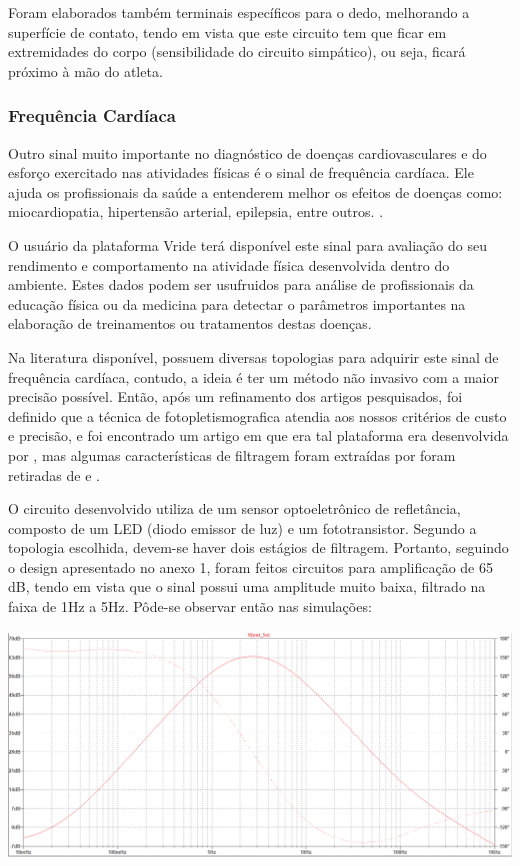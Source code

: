     Foram elaborados também terminais específicos para o dedo, melhorando a superfície de contato, tendo em vista que este circuito tem que ficar em extremidades do corpo (sensibilidade do circuito simpático), ou seja, ficará próximo à mão do atleta.
    

\subsubsection{Frequência Cardíaca}

Outro sinal muito importante no diagnóstico de doenças cardiovasculares e do esforço exercitado nas atividades físicas é o sinal de frequência cardíaca. Ele ajuda os profissionais da saúde a entenderem melhor os efeitos de doenças como: miocardiopatia, hipertensão arterial, epilepsia, entre outros. \cite{VANDERLEI2009} . 
	
O usuário da plataforma Vride terá disponível este sinal para avaliação do seu rendimento e comportamento na atividade física desenvolvida dentro do ambiente. Estes dados podem ser usufruidos para análise de profissionais da educação física ou da medicina para detectar o parâmetros importantes na elaboração de treinamentos ou tratamentos destas doenças. 
	
Na literatura disponível, possuem diversas topologias para adquirir este sinal de frequência cardíaca, contudo, a ideia é ter um método não invasivo com a maior precisão possível. Então, após um refinamento dos artigos pesquisados, foi definido que a técnica de fotopletismografica atendia aos nossos critérios de custo e precisão, e foi encontrado um artigo em que era tal plataforma era desenvolvida por \cite{langereis2010photoplethysmography}, 
mas algumas características de filtragem foram extraídas por foram retiradas de \cite{abhishek2015} e \cite{rheesokwoo2000} . 
	
O circuito desenvolvido utiliza de um sensor optoeletrônico de refletância, composto de um LED (diodo emissor de luz) e um fototransistor. Segundo a topologia escolhida, devem-se haver dois estágios de filtragem. Portanto, seguindo o design apresentado no anexo 1, foram feitos circuitos para amplificação de 65 dB, tendo em vista que o sinal possui uma amplitude muito baixa, filtrado na faixa de 1Hz a 5Hz. Pôde-se observar então nas simulações:
    
    \begin{center}
    	\includegraphics[scale=0.3]{figuras/Simulacao_Cardio}
        \label{cardio_sim}
    \end{center}
    
